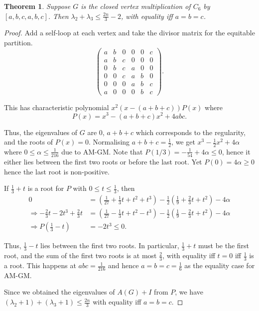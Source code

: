 \documentclass[11pt]{article}
\newtheorem{thm}{Theorem}[section]
\begin{document}
\begin{thm}\label{thm:block}
    Suppose $G$ is the closed vertex multiplication of $C_6$ by $[a, b, c, a, b, c]$. Then $\lambda_2 + \lambda_3 \le \frac{2n}{3} - 2$, with equality iff $a = b = c$. 
\end{thm}
\begin{proof}
    Add a self-loop at each vertex and take the divisor matrix for the equitable partition. 
    \[\begin{pmatrix}
        a & b & 0 & 0 & 0 & c \\
        a & b & c & 0 & 0 & 0 \\
        0 & b & c & a & 0 & 0 \\
        0 & 0 & c & a & b & 0 \\
        0 & 0 & 0 & a & b & c \\
        a & 0 & 0 & 0 & b & c
    \end{pmatrix}.\]
    
    This has characteristic polynomial $x^2(x-(a+b+c))P(x)$ where
    \[P(x) = x^3 - (a+b+c)x^2 + 4abc.\]
    
    Thus, the eigenvalues of $G$ are 0, $a+b+c$ which corresponds to the regularity, and the roots of $P(x) = 0$. Normalising $a + b + c = \frac12$, we get $x^3 - \frac12 x^2 + 4\alpha$ where $0 \le \alpha \le \frac1{216}$ due to AM-GM. Note that $P(1/3) = -\frac1{54} + 4\alpha \le 0$, hence it either lies between the first two roots or before the last root. Yet $P(0) = 4\alpha \ge 0$ hence the last root is non-positive. 

    If $\frac13 + t$ is a root for $P$ with $0 \le t \le \frac13$, then
    \begin{align*}
        0 &= \left(\frac{1}{27} + \frac13 t + t^2 + t^3\right) - \frac12 \left(\frac19 + \frac23 t + t^2\right) - 4\alpha \\ 
        \Rightarrow -\frac23 t - 2t^3 + \frac23 t &= \left(\frac{1}{27} - \frac13 t + t^2 - t^3\right) - \frac12 \left(\frac19 - \frac23 t + t^2\right) - 4\alpha \\
        \Rightarrow P\left(\frac13 - t\right) &= -2t^3 \le 0.
    \end{align*}
    
    Thus, $\frac13 - t$ lies between the first two roots. In particular, $\frac13 + t$ must be the first root, and the sum of the first two roots is at most $\frac23$, with equality iff $t = 0$ iff $\frac13$ is a root. This happens at $abc = \frac1{216}$ and hence $a = b = c = \frac16$ as the equality case for AM-GM. 

    Since we obtained the eigenvalues of $A(G) + I$ from $P$, we have $(\lambda_2 + 1) + (\lambda_3 + 1) \le \frac{2n}{3}$ with equality iff $a = b = c$. 
\end{proof}
\end{document}
